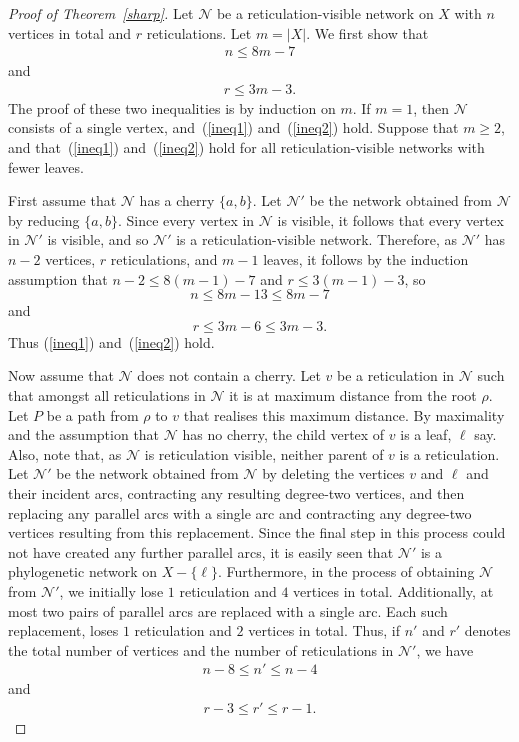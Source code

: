\documentclass[11pt]{amsart}
\begin{document}
\begin{proof}[Proof of Theorem~\ref{sharp}]
Let ${{\mathcal N}}$ be a reticulation-visible network on $X$ with $n$ vertices in total and $r$ reticulations. Let $m=|X|$. We first show that
\begin{align}
n\le 8m-7
\label{ineq1}
\end{align}
and
\begin{align}
r\le 3m-3.
\label{ineq2}
\end{align}
The proof of these two inequalities is by induction on $m$. If $m=1$, then ${{\mathcal N}}$ consists of a single vertex, and~(\ref{ineq1}) and~(\ref{ineq2}) hold. Suppose that $m\ge 2$, and that~(\ref{ineq1}) and~(\ref{ineq2}) hold for all reticulation-visible networks with fewer leaves.

First assume that ${{\mathcal N}}$ has a cherry $\{a, b\}$. Let ${{\mathcal N}}'$ be the network obtained from ${{\mathcal N}}$ by reducing $\{a, b\}$. Since every vertex in ${{\mathcal N}}$ is visible, it follows that every vertex in ${{\mathcal N}}'$ is visible, and so ${{\mathcal N}}'$ is a reticulation-visible network. Therefore, as ${{\mathcal N}}'$ has $n-2$ vertices, $r$ reticulations, and $m-1$ leaves, it follows by the induction assumption that $n-2\leq 8(m-1)-7$ and $r\le 3(m-1)-3$, so
$$n\leq 8m-13\leq 8m-7$$
and
$$r\leq 3m-6\leq 3m-3.$$
Thus (\ref{ineq1}) and~(\ref{ineq2}) hold.

Now assume that ${{\mathcal N}}$ does not contain a cherry. Let $v$ be a reticulation in ${{\mathcal N}}$ such that amongst all reticulations in ${{\mathcal N}}$ it is at maximum distance from the root $\rho$. Let $P$ be a path from $\rho$ to $v$ that realises this maximum distance. By maximality and the assumption that ${{\mathcal N}}$ has no cherry, the child vertex of $v$ is a leaf, $\ell$ say. Also, note that, as ${{\mathcal N}}$ is reticulation visible, neither parent of $v$ is a reticulation. Let ${{\mathcal N}}'$ be the network obtained from ${{\mathcal N}}$ by deleting the vertices $v$ and $\ell$ and their incident arcs, contracting any resulting degree-two vertices, and then replacing any parallel arcs with a single arc and contracting any degree-two vertices resulting from this replacement. Since the final step in this process could not have created any further parallel arcs, it is easily seen that ${{\mathcal N}}'$ is a phylogenetic network on $X-\{\ell\}$. Furthermore, in the process of obtaining ${{\mathcal N}}$ from ${{\mathcal N}}'$, we initially lose $1$ reticulation and $4$ vertices in total. Additionally, at most two pairs of parallel arcs are replaced with a single arc. Each such replacement, loses $1$ reticulation and $2$ vertices in total. Thus, if $n'$ and $r'$ denotes the total number of vertices and the number of reticulations in ${{\mathcal N}}'$, we have
\begin{align}
n-8\le n'\le n-4
\label{eqn1}
\end{align}
and
\begin{align}
r-3\le r'\le r-1.
\label{eqn2}
\end{align}


\end{proof}
\end{document}
